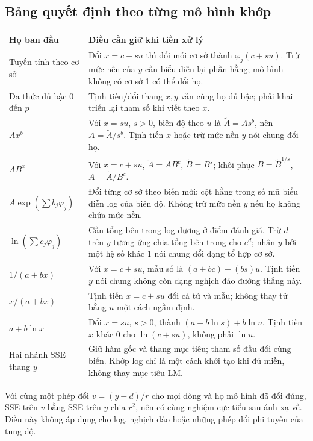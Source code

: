\documentclass[11pt,a4paper]{article}
\begin{document}
\subsection{Bảng quyết định theo từng mô hình khớp}
\begin{center}\small
\begin{tabular}{p{.27\linewidth}p{.66\linewidth}}\toprule
Họ ban đầu & Điều cần giữ khi tiền xử lý\\\midrule
Tuyến tính theo cơ sở & Đổi $x=c+su$ thì đổi mỗi cơ sở thành $\varphi_j(c+su)$. Trừ mức nền của $y$ cần biểu diễn lại phần hằng; mô hình không có cơ sở 1 có thể đổi họ.\\
Đa thức đủ bậc 0 đến $p$ & Tịnh tiến/đổi thang $x,y$ vẫn cùng họ đủ bậc; phải khai triển lại tham số khi viết theo $x$.\\
$A x^b$ & Với $x=su$, $s>0$, biên độ theo $u$ là $\widetilde A=A s^b$, nên $A=\widetilde A/s^b$. Tịnh tiến $x$ hoặc trừ mức nền $y$ nói chung đổi họ.\\
$A B^x$ & Với $x=c+su$, $\widetilde A=A B^c$, $\widetilde B=B^s$; khôi phục $B=\widetilde B^{1/s}$, $A=\widetilde A/B^c$.\\
$A\exp(\sum b_j\varphi_j)$ & Đổi từng cơ sở theo biến mới; cột hằng trong số mũ biểu diễn log của biên độ. Không trừ mức nền $y$ nếu họ không chứa mức nền.\\
$\ln(\sum c_j\varphi_j)$ & Cần tổng bên trong log dương ở điểm đánh giá. Trừ $d$ trên $y$ tương ứng chia tổng bên trong cho $e^d$; nhân $y$ bởi một hệ số khác 1 nói chung đổi dạng tổ hợp cơ sở.\\
$1/(a+bx)$ & Với $x=c+su$, mẫu số là $(a+bc)+(bs)u$. Tịnh tiến $y$ nói chung không còn dạng nghịch đảo đường thẳng này.\\
$x/(a+bx)$ & Tịnh tiến $x=c+su$ đổi cả tử và mẫu; không thay tử bằng $u$ một cách ngầm định.\\
$a+b\ln x$ & Đổi $x=su$, $s>0$, thành $(a+b\ln s)+b\ln u$. Tịnh tiến $x$ khác 0 cho $\ln(c+su)$, không phải $\ln u$.\\
Hai nhánh SSE thang $y$ & Giữ hàm gốc và thang mục tiêu; tham số đầu đổi cùng biến. Khớp log chỉ là một cách khởi tạo khi đủ miền, không thay mục tiêu LM.\\\bottomrule
\end{tabular}\end{center}
Với cùng một phép đổi $v=(y-d)/r$ cho mọi dòng và họ mô hình đã đổi đúng,
SSE trên $v$ bằng SSE trên $y$ chia $r^2$, nên có cùng nghiệm cực tiểu sau ánh xạ về.
Điều này không áp dụng cho log, nghịch đảo hoặc những phép đổi phi tuyến của tung độ.
\end{document}
